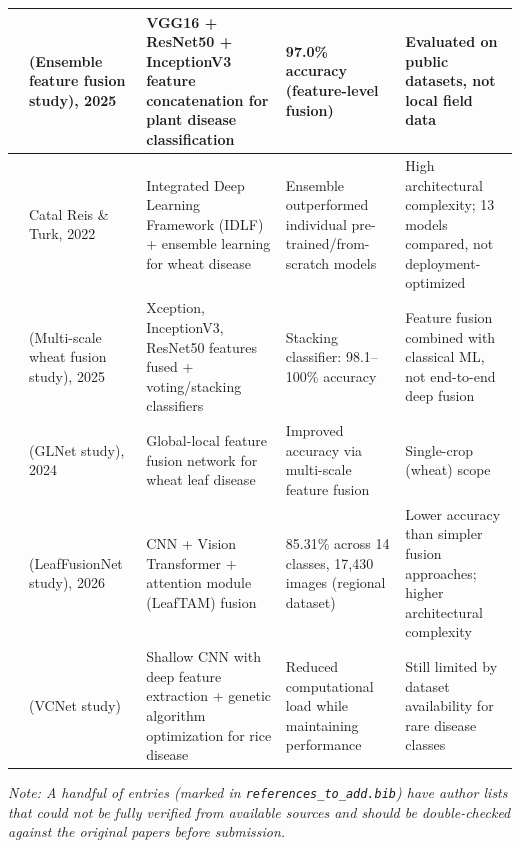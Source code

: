 {\begin{longtable}{|c|p{2.6cm}|p{3.4cm}|p{3.2cm}|p{3.4cm}|}
\cite{ensemble_featurefusion_2025} & (Ensemble feature fusion study), 2025 & VGG16 + ResNet50 + InceptionV3 feature concatenation for plant disease classification & 97.0\% accuracy (feature-level fusion) & Evaluated on public datasets, not local field data \\ \hline
\cite{catalreis2022wheat} & Catal Reis \& Turk, 2022 & Integrated Deep Learning Framework (IDLF) + ensemble learning for wheat disease & Ensemble outperformed individual pre-trained/from-scratch models & High architectural complexity; 13 models compared, not deployment-optimized \\ \hline
\cite{multiscale_wheat_fusion_2025} & (Multi-scale wheat fusion study), 2025 & Xception, InceptionV3, ResNet50 features fused + voting/stacking classifiers & Stacking classifier: 98.1--100\% accuracy & Feature fusion combined with classical ML, not end-to-end deep fusion \\ \hline
\cite{glnet2024wheat} & (GLNet study), 2024 & Global-local feature fusion network for wheat leaf disease & Improved accuracy via multi-scale feature fusion & Single-crop (wheat) scope \\ \hline
\cite{leaffusionnet2026} & (LeafFusionNet study), 2026 & CNN + Vision Transformer + attention module (LeafTAM) fusion & 85.31\% across 14 classes, 17,430 images (regional dataset) & Lower accuracy than simpler fusion approaches; higher architectural complexity \\ \hline
\cite{vcnet_rice} & (VCNet study) & Shallow CNN with deep feature extraction + genetic algorithm optimization for rice disease & Reduced computational load while maintaining performance & Still limited by dataset availability for rare disease classes \\ \hline
\end{longtable}
}

\textit{Note: A handful of entries (marked in \texttt{references\_to\_add.bib}) have author lists that could not be fully verified from available sources and should be double-checked against the original papers before submission.}


